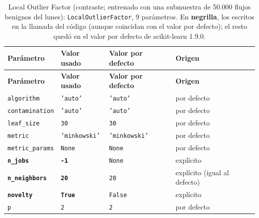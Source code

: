 \documentclass[11pt,a4paper]{article}
\begin{document}
{%
\begin{longtable}{L{3.9cm} L{3.7cm} L{3.0cm} L{2.4cm}}
\caption{Local Outlier Factor (contraste; entrenado con una submuestra de 50.000 flujos benignos del lunes): \texttt{LocalOutlierFactor}, 9 parámetros. En \textbf{negrilla}, los escritos en la llamada del código (aunque coincidan con el valor por defecto); el resto quedó en el valor por defecto de scikit-learn 1.9.0.}\label{tab:param-lof}\\
\toprule
\textbf{Parámetro} & \textbf{Valor usado} & \textbf{Valor por defecto} & \textbf{Origen} \\
\midrule
\endfirsthead
\toprule
\textbf{Parámetro} & \textbf{Valor usado} & \textbf{Valor por defecto} & \textbf{Origen} \\
\midrule
\endhead
\bottomrule
\endfoot
\texttt{algorithm} & \texttt{'auto'} & \texttt{'auto'} & por defecto \\
\texttt{contamination} & \texttt{'auto'} & \texttt{'auto'} & por defecto \\
\texttt{leaf\_size} & \texttt{30} & \texttt{30} & por defecto \\
\texttt{metric} & \texttt{'minkowski'} & \texttt{'minkowski'} & por defecto \\
\texttt{metric\_params} & \texttt{None} & \texttt{None} & por defecto \\
\textbf{\texttt{n\_jobs}} & \textbf{\texttt{-1}} & \texttt{None} & explícito \\
\textbf{\texttt{n\_neighbors}} & \textbf{\texttt{20}} & \texttt{20} & explícito (igual al defecto) \\
\textbf{\texttt{novelty}} & \textbf{\texttt{True}} & \texttt{False} & explícito \\
\texttt{p} & \texttt{2} & \texttt{2} & por defecto \\
\end{longtable}

}
\end{document}
